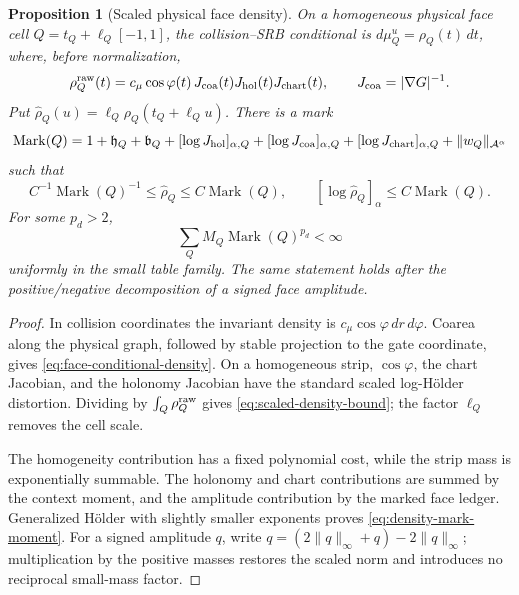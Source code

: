 \documentclass[11pt]{article}
\newtheorem{proposition}[theorem]{Proposition}
\begin{document}
\begin{proposition}[Scaled physical face density]
\label{prop:scaled-face-density}
On a homogeneous physical face cell
\(Q=t_Q+\ell_Q[-1,1]\), the collision--SRB conditional is
\(d\mu_Q^u=\rho_Q(t)\,dt\), where, before normalization,
\begin{equation}
\label{eq:face-conditional-density}
 \rho_Q^{\rm raw}(t)=c_\mu\cos\varphi(t)\,J_{\rm coa}(t)
 J_{\rm hol}(t)J_{\rm chart}(t),
 \qquad J_{\rm coa}=|\nabla G|^{-1}.
\end{equation}
Put
\(\widehat\rho_Q(u)=\ell_Q\rho_Q(t_Q+\ell_Qu)\).  There is a mark
\begin{equation}
\label{eq:density-mark-definition}
 \operatorname{Mark}(Q)=
 1+\mathfrak h_Q+\mathfrak b_Q+
 [\log J_{\rm hol}]_{\alpha,Q}
 +[\log J_{\rm coa}]_{\alpha,Q}
 +[\log J_{\rm chart}]_{\alpha,Q}
 +\|w_Q\|_{\mathcal A^\alpha}
\end{equation}
such that
\begin{equation}
\label{eq:scaled-density-bound}
 C^{-1}\operatorname{Mark}(Q)^{-1}
 \le\widehat\rho_Q\le C\operatorname{Mark}(Q),\qquad
 [\log\widehat\rho_Q]_\alpha
 \le C\operatorname{Mark}(Q).
\end{equation}
For some \(p_d>2\),
\begin{equation}
\label{eq:density-mark-moment}
 \sum_Q M_Q\operatorname{Mark}(Q)^{p_d}<\infty
\end{equation}
uniformly in the small table family.  The same statement holds after the
positive/negative decomposition of a signed face amplitude.
\end{proposition}

\begin{proof}
In collision coordinates the invariant density is
\(c_\mu\cos\varphi\,dr\,d\varphi\).  Coarea along the physical graph, followed
by stable projection to the gate coordinate, gives
\eqref{eq:face-conditional-density}.  On a homogeneous strip,
\(\cos\varphi\), the chart Jacobian, and the holonomy Jacobian have the
standard scaled log-Hölder distortion.  Dividing by
\(\int_Q\rho_Q^{\rm raw}\) gives \eqref{eq:scaled-density-bound}; the factor
\(\ell_Q\) removes the cell scale.

The homogeneity contribution has a fixed polynomial cost, while the strip
mass is exponentially summable.  The holonomy and chart contributions are
summed by the context moment, and the amplitude contribution by the marked
face ledger.  Generalized Hölder with slightly smaller exponents proves
\eqref{eq:density-mark-moment}.  For a signed amplitude \(q\), write
\(q=(2\|q\|_\infty+q)-2\|q\|_\infty\); multiplication by the positive masses
restores the scaled norm and introduces no reciprocal small-mass factor.
\end{proof}
\end{document}
